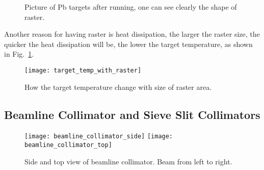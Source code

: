 \begin{figure}
    \caption{Picture of Pb targets after running, one can see clearly the shape
    of raster.}
\end{figure}

Another reason for having raster is heat dissipation, the larger the raster size,
the quicker the heat dissipation will be, the lower the target temperature, as
shown in Fig.~\ref{fig:target_temp_with_raster}.
\begin{figure}
    \centering
    \texttt{[image: target\_temp\_with\_raster]}
    \caption{How the target temperature change with size of raster area.}
    \label{fig:target_temp_with_raster}
\end{figure}

\subsection{Beamline Collimator and Sieve Slit Collimators}
\begin{figure}[h!]
    \centering
    \texttt{[image: beamline\_collimator\_side]}
    \hspace{1 cm}
    \texttt{[image: beamline\_collimator\_top]}
    \caption{Side and top view of beamline collimator. Beam from left to right.}
    \label{fig:beamline_collimator}
\end{figure}

